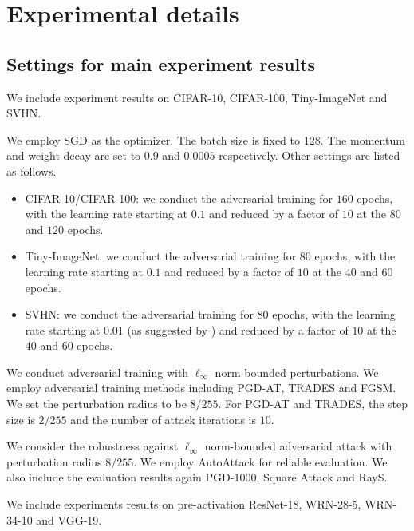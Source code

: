 \section{Experimental details}
\label{sect:exp-setting-all}

\subsection{Settings for main experiment results}
\label{sect: exp-practical}
We include experiment results on CIFAR-10, CIFAR-100, Tiny-ImageNet and SVHN.

We employ SGD as the optimizer. The batch size is fixed to 128. The momentum and weight decay are set to $0.9$ and $0.0005$ respectively. Other settings are listed as follows.
\begin{itemize}[leftmargin=*,nosep]
    \item CIFAR-10/CIFAR-100: we conduct the adversarial training for $160$ epochs, with the learning rate starting at $0.1$ and reduced by a factor of $10$ at the $80$ and $120$ epochs.
    \item Tiny-ImageNet: we conduct the adversarial training for $80$ epochs, with the learning rate starting at $0.1$ and reduced by a factor of $10$ at the $40$ and $60$ epochs.
    \item SVHN: we conduct the adversarial training for $80$ epochs, with the learning rate starting at $0.01$ (as suggested by \citep{chen2021robust}) and reduced by a factor of $10$ at the $40$ and $60$ epochs.
\end{itemize}

We conduct adversarial training with $\ell_\infty$ norm-bounded perturbations. We employ adversarial training methods including PGD-AT, TRADES and FGSM. We set the perturbation radius to be $8/255$. For PGD-AT and TRADES, the step size is $2/255$ and the number of attack iterations is $10$.


We consider the robustness against $\ell_\infty$ norm-bounded adversarial attack with perturbation radius $8/255$. We employ AutoAttack for reliable evaluation. We also include the evaluation results again PGD-1000, Square Attack and RayS.


We include experiments results on pre-activation ResNet-18, WRN-28-5, WRN-34-10 and VGG-19. 

